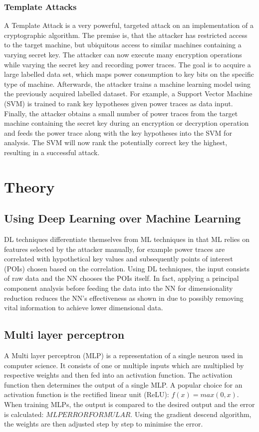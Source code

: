 \documentclass[journal]{IEEEtran}
\begin{document}
\subsubsection{Template Attacks}
\label{subsec:template}
A Template Attack is a very powerful, targeted attack on an implementation of a cryptographic algorithm. The premise is, that the attacker has restricted access to the target machine, but ubiquitous access to similar machines containing a varying secret key. The attacker can now execute many encryption operations while varying the secret key and recording power traces. The goal is to acquire a large labelled data set, which maps power consumption to key bits on the specific type of machine. Afterwards, the attacker trains a machine learning model using the previously acquired labelled dataset. For example, a Support Vector Machine (SVM) is trained to rank key hypotheses given power traces as data input. Finally, the attacker obtains a small number of power traces from the target machine containing the secret key during an encryption or decryption operation and feeds the power trace along with the key hypotheses into the SVM for analysis. The SVM will now rank the potentially correct key the highest, resulting in a successful attack.


\section{Theory}
\subsection{Using Deep Learning over Machine Learning}
DL techniques differentiate themselves from ML techniques in that ML relies on features selected by the attacker manually, for example power traces are correlated with hypothetical key values and subsequently points of interest (POIs) chosen based on the correlation. Using DL techniques, the input consists of raw data and the NN chooses the POIs itself. In fact, applying a principal component analysis before feeding the data into the NN for dimensionality reduction reduces the NN's effectiveness as shown in \cite[p.~15]{breaking-crypto-dl:prouff} due to possibly removing vital information to achieve lower dimensional data.
\subsection{Multi layer perceptron}
\label{sc:mlp}
A Multi layer perceptron (MLP) is a representation of a single neuron used in computer science. It consists of one or multiple inputs which are multiplied by respective weights and then fed into an activation function. The activation function then determines the output of a single MLP. A popular choice for an activation function is the rectified linear unit (ReLU): $ f(x)=max(0, x) $. When training MLPs, the output is compared to the desired output and the error is calculated: $ MLP ERROR FORMULAR $. Using the gradient descend algorithm, the weights are then adjusted step by step to minimise the error. 
\end{document}
